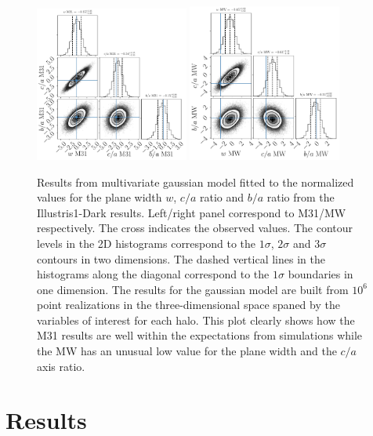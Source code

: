 \documentclass[a4paper,fleqn,usenatbib]{mnras}
\begin{document}
\begin{figure}
\centering
\includegraphics[width=0.45\textwidth]{gaussian_model_illustrisdm_M31.pdf}
\includegraphics[width=0.45\textwidth]{gaussian_model_illustrisdm_MW.pdf}
\caption{Results from multivariate gaussian model fitted to the
  normalized values for the plane width $w$, $c/a$ ratio and $b/a$
  ratio from the Illustris1-Dark results.  
  Left/right panel correspond to M31/MW respectively.  
  The cross indicates the observed values.
  The contour levels in the 2D histograms correspond to the $1\sigma$,
$2\sigma$ and $3\sigma$ contours in two dimensions.
  The dashed vertical lines in the histograms along the diagonal
  correspond to the $1\sigma$ boundaries in one dimension.
  The results for the gaussian model are built from $10^6$ point
  realizations in the three-dimensional space spaned by the variables of
  interest for each halo. 
  This plot clearly shows how the M31 results are well within the
  expectations from simulations while the MW has an unusual low value for
  the plane width and the $c/a$ axis ratio.
\label{fig:correlations_illustrisdm}}
\end{figure}


\section{Results}
\label{sec:results}
\end{document}
